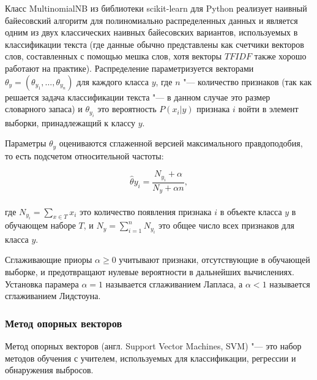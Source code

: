 \documentclass[bachelor, och, coursework]{SCWorks}
\begin{document}
            Класс MultinomialNB из библиотеки scikit-learn для Python реализует
            наивный байесовский алгоритм для полиномиально распределенных данных
            и является одним из двух классических наивных байесовских вариантов,
            используемых в классификации текста (где данные обычно представлены
            как счетчики векторов слов, составленных с помощью мешка слов, хотя
            векторы $TFIDF$ также хорошо работают на практике). Распределение
            параметризуется векторами $\theta_y = (\theta_{y_1}, \dots,
            \theta_{y_n})$ для каждого класса $y$, где $n$ "--- количество
            признаков (так как решается задача классификации текста "--- в
            данном случае это размер словарного запаса) и $\theta_{y_i}$ это
            вероятность $P(x_i | y)$ признака $i$ войти в элемент выборки,
            принадлежащий к классу $y$.

            Параметры $\theta_y$ оцениваются сглаженной версией максимального
            правдоподобия, то есть подсчетом относительной частоты:

            \begin{equation}
                \hat{\theta}{y_i} = \frac{N_{y_i} + \alpha}{N_y + \alpha n},
            \end{equation}
            \\
            где $N_{y_i} = \sum_{x \in T} x_i$ это количество появления признака
            $i$ в объекте класса $y$ в обучающем наборе $T$, и $N_y = \sum_{i =
            1}^{n} N_{y_i}$ это общее число всех признаков для класса $y$.

            Сглаживающие приоры $\alpha \geq 0$ учитывают признаки,
            отсутствующие в обучающей выборке, и предотвращают нулевые
            вероятности в дальнейших вычислениях. Установка парамера $\alpha =
            1$ называется сглаживанием Лапласа, а $\alpha < 1$ называется
            сглаживанием Лидстоуна. \cite{fwsl}

        \subsubsection{Метод опорных векторов}


            Метод опорных векторов (англ. Support Vector Machines, SVM) "--- это
            набор методов обучения с учителем, используемых для классификации,
            регрессии и обнаружения выбросов.
\end{document}

